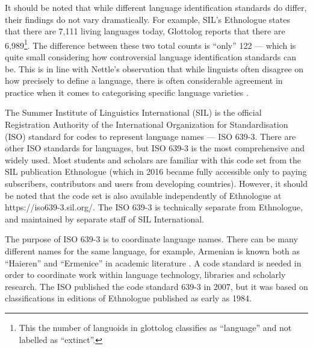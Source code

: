 \documentclass[a4paper,10pt]{article} %
\begin{document}
It should be noted that while different language identification standards do differ, their findings do not vary dramatically. For example, SIL's Ethnologue states that there are 7,111 living languages today, Glottolog reports that there are 6,989\footnote{This the number of languoids in glottolog classifies as ``language'' and not labelled as ``extinct''.}. The difference between these two total counts is ``only'' 122 --- which is quite small considering how controversial language identification standards can be. This is in line with Nettle's observation that while linguists often disagree on how precisely to define a language, there is often considerable agreement in practice when it comes to categorising specific language varieties \citep[356]{NETTLE1998}.

The Summer Institute of Linguistics International (SIL) is the official Registration Authority of the International Organization for Standardisation (ISO) standard for codes to represent language names --- ISO 639-3. There are other ISO standards for languages, but ISO 639-3 is the most comprehensive and widely used. Most students and scholars are familiar with this code set from the SIL publication Ethnologue (which in 2016 became fully accessible only to paying subscribers, contributors and users from developing countries). However, it should be noted that the code set is also available independently of Ethnologue at https://iso639-3.sil.org/. The ISO 639-3 is technically separate from Ethnologue, and maintained by separate staff of SIL International.

The purpose of ISO 639-3 is to coordinate language names. There can be many different names for the same language, for example, Armenian is known both as ``Haieren'' and ``Ermenice'' in academic literature \citep{multitree2014}. A code standard is needed in order to coordinate work within language technology, libraries and scholarly research. The ISO published the code standard 639-3 in 2007, but it was based on classifications in editions of Ethnologue published as early as 1984. %
\end{document}
